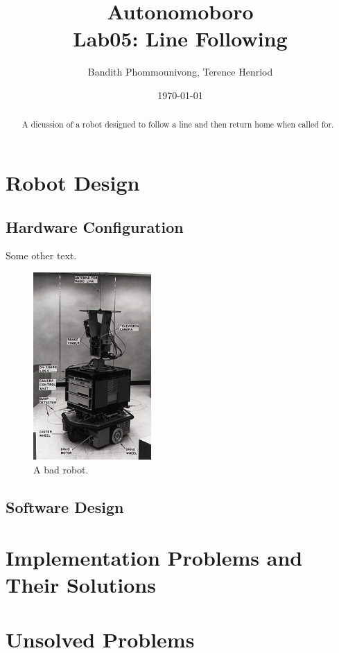 \documentclass{article}
\title{Autonomoboro \\ Lab05: Line Following}
\author{Bandith Phommounivong, Terence Henriod}
\date{\today}
\begin{document}
\maketitle

\begin{abstract}
A dicussion of a robot designed to follow a line and then return home when called for.
\end{abstract}

\newpage

\section{Robot Design}
	\subsection{Hardware Configuration}

Some other text.

	\begin{figure}[h!]
	\centering
	\includegraphics[width = 0.4\textwidth]{shakey}%
	\caption{A bad robot.}
	\label{fig:bad_robot}
	\end{figure}

	\subsection{Software Design}

\section{Implementation Problems and Their Solutions}

\section{Unsolved Problems}
\end{document}
